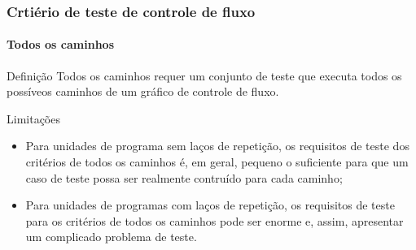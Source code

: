 \begin{frame}
\frametitle{Crtiério de teste de controle de fluxo}
\framesubtitle{Todos os caminhos}
\label{concept:all-paths-criterion}
\label{concept:all-paths}

\begin{block:concept}{Definição}
Todos os caminhos requer um conjunto de teste que executa todos os possíveos caminhos de um gráfico de controle de fluxo.
\end{block:concept}

\begin{block:fact}{Limitações}
\begin{itemize}
	\item Para unidades de programa sem laços de repetição, os requisitos de teste dos
	critérios de todos os caminhos é, em geral, pequeno o suficiente para que um caso de teste
	possa ser realmente contruído para cada caminho;

	\item Para unidades de programas com laços de repetição, os requisitos de teste para os critérios 
	de todos os caminhos pode ser enorme e, assim, apresentar um complicado problema de teste.
\end{itemize}
\end{block:fact}
\end{frame}
